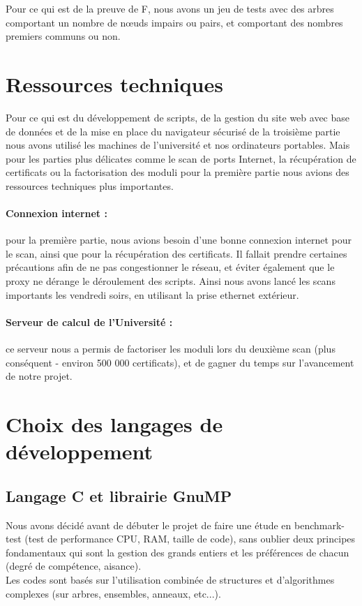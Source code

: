Pour ce qui est de la preuve de F, nous avons un jeu de tests avec des arbres comportant un nombre de nœuds impairs ou pairs, et comportant des nombres premiers communs ou non.

\section{Ressources techniques}

Pour ce qui est du développement de scripts, de la gestion du site web avec base de données et de la mise en place du navigateur sécurisé de la troisième partie nous avons utilisé les machines de l'université et nos ordinateurs portables. Mais pour les parties plus délicates comme le scan de ports Internet, la récupération de certificats ou la factorisation des moduli pour la première partie nous avions des ressources techniques plus importantes.

\paragraph{Connexion internet : } pour la première partie, nous avions besoin d'une bonne connexion internet pour le scan, ainsi que pour la récupération des certificats. Il fallait prendre certaines précautions afin de ne pas congestionner le réseau, et éviter également que le proxy ne dérange le déroulement des scripts. Ainsi nous avons lancé les scans importants les vendredi soirs, en utilisant la prise ethernet extérieur.

\paragraph{Serveur de calcul de l'Université :} ce serveur nous a permis de factoriser les moduli lors du deuxième scan (plus conséquent - environ 500 000 certificats), et de gagner du temps sur l'avancement de notre projet.

\section{Choix des langages de développement}

\subsection{Langage C et librairie GnuMP}

Nous avons décidé avant de débuter le projet de faire une étude en benchmark-test \cite{chooseprogram2013} \cite{marceau2009program} \cite{udemypng} (test de performance CPU, RAM, taille de code), sans oublier deux principes fondamentaux qui sont la gestion des grands entiers et les préférences de chacun (degré de compétence, aisance).\\
Les codes sont basés sur l'utilisation combinée de structures et d'algorithmes complexes (sur arbres, ensembles, anneaux, etc...).\\

